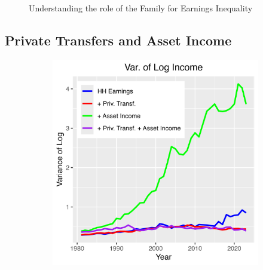 \documentclass{article}
\begin{document}
\begin{figure}
\begin{subfigure}[t]{0.475\textwidth}
        \label{fig:Indi_to_HH_correlation}
    \end{subfigure}
    \caption{Understanding the role of the Family for Earnings Inequality}
    \label{fig:Indi_to_HH}
\end{figure}

\subsection{Private Transfers and Asset Income}

\begin{figure}
    \centering
    \begin{subfigure}[t]{0.475\textwidth}
        \centering
        \includegraphics[width=\textwidth]{Fig_4/Fig_4a_Var_inc.png}
        \label{fig:Trans_Asset_Var1}
    \end{subfigure}
    \begin{subfigure}[t]{0.475\textwidth}
        \centering

\end{subfigure}
\end{figure}
\end{document}
